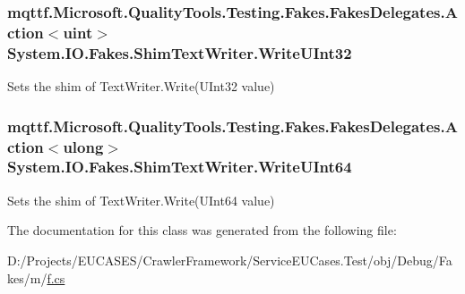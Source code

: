 \hypertarget{class_system_1_1_i_o_1_1_fakes_1_1_shim_text_writer_ae3e8aaa0dde5d99d484fd8321f95a942}{
\subsubsection[{Write\-U\-Int32}]{\setlength{\rightskip}{0pt plus 5cm}mqttf.\-Microsoft.\-Quality\-Tools.\-Testing.\-Fakes.\-Fakes\-Delegates.\-Action$<$uint$>$ System.\-I\-O.\-Fakes.\-Shim\-Text\-Writer.\-Write\-U\-Int32\hspace{0.3cm}{\ttfamily [set]}}}\label{class_system_1_1_i_o_1_1_fakes_1_1_shim_text_writer_ae3e8aaa0dde5d99d484fd8321f95a942}


Sets the shim of Text\-Writer.\-Write(\-U\-Int32 value)

\hypertarget{class_system_1_1_i_o_1_1_fakes_1_1_shim_text_writer_ae4ffa8760a7efa387730cf257e0a41ff}{
\subsubsection[{Write\-U\-Int64}]{\setlength{\rightskip}{0pt plus 5cm}mqttf.\-Microsoft.\-Quality\-Tools.\-Testing.\-Fakes.\-Fakes\-Delegates.\-Action$<$ulong$>$ System.\-I\-O.\-Fakes.\-Shim\-Text\-Writer.\-Write\-U\-Int64\hspace{0.3cm}{\ttfamily [set]}}}\label{class_system_1_1_i_o_1_1_fakes_1_1_shim_text_writer_ae4ffa8760a7efa387730cf257e0a41ff}


Sets the shim of Text\-Writer.\-Write(\-U\-Int64 value)



The documentation for this class was generated from the following file\-:\begin{DoxyCompactItemize}
\item 
D\-:/\-Projects/\-E\-U\-C\-A\-S\-E\-S/\-Crawler\-Framework/\-Service\-E\-U\-Cases.\-Test/obj/\-Debug/\-Fakes/m/\hyperlink{m_2f_8cs}{f.\-cs}\end{DoxyCompactItemize}
